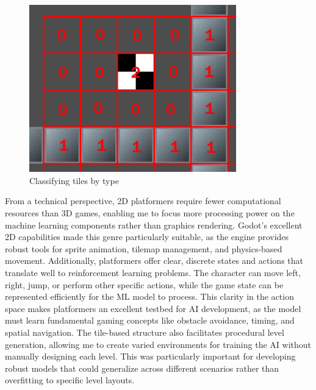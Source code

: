\begin{figure}[h]
    \centering
    \includegraphics[width=0.8\textwidth]{figures/tilemap.png}
    \caption{Classifying tiles by type}
    \label{fig:tilemap}
\end{figure}

From a technical perspective, 2D platformers require fewer computational resources than 3D games, enabling me to focus more processing power on the machine learning components rather than graphics rendering. 
Godot's excellent 2D capabilities made this genre particularly suitable, as the engine provides robust tools for sprite animation, tilemap management, and physics-based movement.
Additionally, platformers offer clear, discrete states and actions that translate well to reinforcement learning problems. 
The character can move left, right, jump, or perform other specific actions, while the game state can be represented efficiently for the ML model to process.
This clarity in the action space makes platformers an excellent testbed for AI development, as the model must learn fundamental gaming concepts like obstacle avoidance, timing, and spatial navigation.
The tile-based structure also facilitates procedural level generation, allowing me to create varied environments for training the AI without manually designing each level. 
This was particularly important for developing robust models that could generalize across different scenarios rather than overfitting to specific level layouts.

